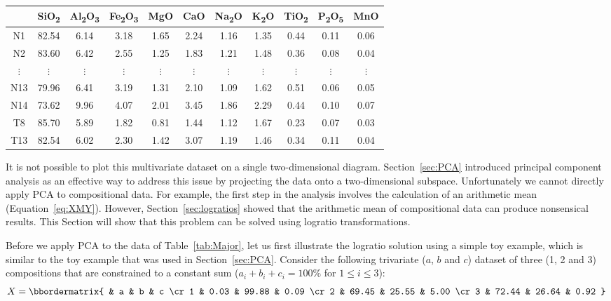 \begin{center}
\begin{tabular}{c|cccccccccc}
 & SiO\textsubscript{2} & Al\textsubscript{2}O\textsubscript{3} & 
Fe\textsubscript{2}O\textsubscript{3} & MgO & CaO & Na\textsubscript{2}O & 
K\textsubscript{2}O & TiO\textsubscript{2} & 
P\textsubscript{2}O\textsubscript{5} & MnO\\ \hline
N1 & 82.54 & 6.14 & 3.18 & 1.65 & 2.24 & 1.16 & 1.35 & 0.44 & 0.11 & 0.06\\
N2 & 83.60 & 6.42 & 2.55 & 1.25 & 1.83 & 1.21 & 1.48 & 0.36 & 0.08 & 0.04\\
$\vdots$ & $\vdots$ & $\vdots$ & $\vdots$ & $\vdots$ & $\vdots$ &
$\vdots$ & $\vdots$ & $\vdots$ & $\vdots$ & $\vdots$ \\
N13 & 79.96 & 6.41 & 3.19 & 1.31 & 2.10 & 1.09 & 1.62 & 0.51 & 0.06 & 0.05\\
N14 & 73.62 & 9.96 & 4.07 & 2.01 & 3.45 & 1.86 & 2.29 & 0.44 & 0.10 & 0.07\\
T8 & 85.70 & 5.89 & 1.82 & 0.81 & 1.44 & 1.12 & 1.67 & 0.23 & 0.07 & 0.03\\
T13 & 82.54 & 6.02 & 2.30 & 1.42 & 3.07 & 1.19 & 1.46 & 0.34 & 0.11 & 0.04
\end{tabular}
\label{tab:Major}
\end{center}

It is not possible to plot this multivariate dataset on a single
two-dimensional diagram. Section~\ref{sec:PCA} introduced principal
component analysis as an effective way to address this issue by
projecting the data onto a two-dimensional subspace. Unfortunately we
cannot directly apply PCA to compositional data. For example, the
first step in the analysis involves the calculation of an arithmetic
mean (Equation~\ref{eq:XMY}). However, Section~\ref{sec:logratios}
showed that the arithmetic mean of compositional data can produce
nonsensical results. This Section will show that this problem can be
solved using logratio transformations.\medskip

Before we apply PCA to the data of Table~\ref{tab:Major}, let us first
illustrate the logratio solution using a simple toy example, which is
similar to the toy example that was used in
Section~\ref{sec:PCA}. Consider the following trivariate ($a$, $b$ and
$c$) dataset of three (1, 2 and 3) compositions that are constrained
to a constant sum ($a_i+b_i+c_i=100\%$ for $1\leq{i}\leq{3}$):
\begin{equation}
  X =
  \bbordermatrix{ & a & b & c \cr
   1 & 0.03 & 99.88 & 0.09 \cr
   2 & 69.45 & 25.55 & 5.00 \cr
   3 & 72.44 & 26.64 & 0.92
  }
  \label{eq:Xcomp}
\end{equation}

